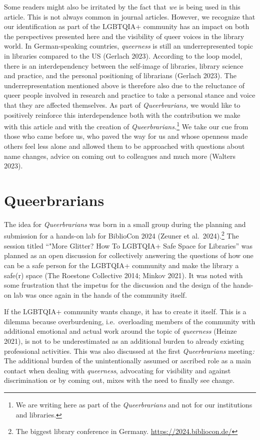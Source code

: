 \documentclass[a4paper,
fontsize=11pt,
oneside,
numbers=noperiodatend,
parskip=half-,
bibliography=totoc,
final
]{scrartcl}
\begin{document}
Some readers might also be irritated by the fact that \emph{we} is being
used in this article. This is not always common in journal articles.
However, we recognize that our identification as part of the LGBTQIA+
community has an impact on both the perspectives presented here and the
visibility of queer voices in the library world. In German-speaking
countries, \emph{queerness} is still an underrepresented topic in
libraries compared to the US (Gerlach 2023). According to the loop
model, there is an interdependency between the self-image of libraries,
library science and practice, and the personal positioning of librarians
(Gerlach 2023). The underrepresentation mentioned above is therefore
also due to the reluctance of queer people involved in research and
practice to take a personal stance and voice that they are affected
themselves. As part of \emph{Queerbrarians,} we would like to positively
reinforce this interdependence both with the contribution we make with
this article and with the creation of \emph{Queerbrarians.}\footnote{We
  are writing here as part of the \emph{Queerbrarians} and not for our
  institutions and libraries.} We take our cue from those who came
before us, who paved the way for us and whose openness made others feel
less alone and allowed them to be approached with questions about name
changes, advice on coming out to colleagues and much more (Walters
2023).

\hypertarget{queerbrarians}{%
\section{Queerbrarians}\label{queerbrarians}}

The idea for \emph{Queerbrarians} was born in a small group during the
planning and submission for a hands-on lab for BiblioCon 2024 (Zeuner
et al.~2024).\footnote{The biggest library conference in Germany.
  \url{https://2024.bibliocon.de/}} The session titled \enquote{"More Glitter?
How To LGBTQIA+ Safe Space for Libraries} was planned as an open
discussion for collectively answering the questions of how one can be a
safe person for the LGBTQIA+ community and make the library a safe(r)
space (The Roestone Collective 2014; Minkov 2021). It was noted with
some frustration that the impetus for the discussion and the design of
the hands-on lab was once again in the hands of the community itself.

If the LGBTQIA+ community wants change, it has to create it itself. This
is a dilemma because overburdening, i.e.~overloading members of the
community with additional emotional and actual work around the topic of
\emph{queerness} (Heinze 2021), is not to be underestimated as an
additional burden to already existing professional activities. This was
also discussed at the first \emph{Queerbrarians} meeting\emph{:} The
additional burden of the unintentionally assumed or ascribed role as a
main contact when dealing with \emph{queerness}, advocating for
visibility and against discrimination or by coming out, mixes with the
need to finally see change.
\end{document}
